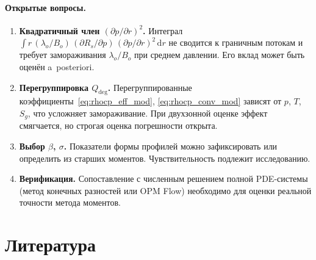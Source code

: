 \documentclass[12pt,a4paper]{article}
\newcommand{\dd}{\mathrm{d}}
\newcommand{\pp}{\partial}
\begin{document}
\paragraph{Открытые вопросы.}
\begin{enumerate}[nosep]
  \item \textbf{Квадратичный член $(\pp p/\pp r)^2$.}
        Интеграл $\int r\,(\lambda_o/B_o)\,(\pp R_s/\pp p)\,
        (\pp p/\pp r)^2\,\dd r$ не сводится к граничным потокам
        и требует замораживания $\lambda_o/B_o$ при среднем давлении.
        Его вклад может быть оценён a~posteriori.

  \item \textbf{Перегруппировка $Q_\mathrm{deg}$.}
        Перегруппированные коэффициенты~\eqref{eq:rhocp_eff_mod},
        \eqref{eq:rhocp_conv_mod} зависят от $p$, $T$, $S_g$,
        что усложняет замораживание. При двухзонной оценке
        эффект смягчается, но строгая оценка погрешности открыта.

  \item \textbf{Выбор $\beta$, $\sigma$.}
        Показатели формы профилей можно зафиксировать или определить
        из старших моментов. Чувствительность подлежит исследованию.

  \item \textbf{Верификация.}
        Сопоставление с численным решением полной PDE-системы
        (метод конечных разностей или OPM Flow)
        необходимо для оценки реальной точности метода моментов.
\end{enumerate}


\section*{Литература}
\end{document}
